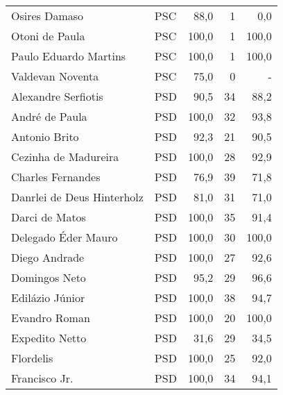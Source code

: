 \begin{longtable}{llrrr}
                       Osires Damaso &            PSC &      88,0 &            1 &        0,0 \\
                      Otoni de Paula &            PSC &     100,0 &            1 &      100,0 \\
               Paulo Eduardo Martins &            PSC &     100,0 &            1 &      100,0 \\
                    Valdevan Noventa &            PSC &      75,0 &            0 &          - \\
                 Alexandre Serfiotis &            PSD &      90,5 &           34 &       88,2 \\
                      André de Paula &            PSD &     100,0 &           32 &       93,8 \\
                       Antonio Brito &            PSD &      92,3 &           21 &       90,5 \\
                Cezinha de Madureira &            PSD &     100,0 &           28 &       92,9 \\
                   Charles Fernandes &            PSD &      76,9 &           39 &       71,8 \\
          Danrlei de Deus Hinterholz &            PSD &      81,0 &           31 &       71,0 \\
                      Darci de Matos &            PSD &     100,0 &           35 &       91,4 \\
                 Delegado Éder Mauro &            PSD &     100,0 &           30 &      100,0 \\
                       Diego Andrade &            PSD &     100,0 &           27 &       92,6 \\
                       Domingos Neto &            PSD &      95,2 &           29 &       96,6 \\
                     Edilázio Júnior &            PSD &     100,0 &           38 &       94,7 \\
                       Evandro Roman &            PSD &     100,0 &           20 &      100,0 \\
                      Expedito Netto &            PSD &      31,6 &           29 &       34,5 \\
                           Flordelis &            PSD &     100,0 &           25 &       92,0 \\
                       Francisco Jr. &            PSD &     100,0 &           34 &       94,1 \\

\end{longtable}
